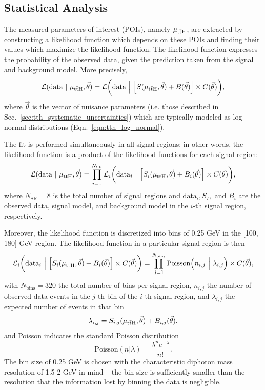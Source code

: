 \subsection{Statistical Analysis} \label{sec:tth_stat_analysis}
The measured parameters of interest (POIs), namely $\mu_{\mathrm{t\bar{t}H}}$, are extracted by constructing a likelihood function which depends on these POIs and finding their values which maximize the likelihood function.
The likelihood function expresses the probability of the observed data, given the prediction taken from the signal and background model.
More precisely,
\begin{equation}
    \mathcal L (\text{data} ~|~ \mu_{\mathrm{t\bar{t}H}}, \vec{\theta}) = \mathcal L \bigg(\text{data} ~\Big|~ \Big[ S(\mu_{\mathrm{t\bar{t}H}}, \vec{\theta}) + B(\vec{\theta}) \Big] \times C(\vec{\theta}) \bigg),
\end{equation} 
where $\vec{\theta}$ is the vector of nuisance parameters (i.e. those described in Sec.~\ref{sec:tth_systematic_uncertainties}) which are typically modeled as log-normal distributions (Eqn.~\ref{eqn:tth_log_normal}).

The fit is performed simultaneously in all signal regions; in other words, the likelihood function is a product of the likelihood functions for each signal region:
\begin{equation}
    \mathcal L (\text{data} ~|~ \mu_{\mathrm{t\bar{t}H}}, \vec{\theta})
    =
    \prod_{i=1}^{N_{\text{SR}}} \mathcal L_i \bigg(\text{data}_i ~\Big|~ \Big[ S_i(\mu_{\mathrm{t\bar{t}H}}, \vec{\theta}) + B_i(\vec{\theta}) \Big] \times C(\vec{\theta}) \bigg),
\end{equation}
where $N_{\text{SR}} = 8$ is the total number of signal regions and $\text{data}_i, S_I,$ and $B_i$ are the observed data, signal model, and background model in the $i$-th signal region, respectively.

Moreover, the likelihood function is discretized into bins of 0.25 GeV in the [100, 180] GeV region. The likelihood function in a particular signal region is then
\begin{equation}
    \mathcal L_i \bigg(\text{data}_i ~\Big|~ \Big[ S_i(\mu_{\mathrm{t\bar{t}H}}, \vec{\theta}) + B_i(\vec{\theta}) \Big] \times C(\vec{\theta}) \bigg)
    = 
    \prod_{j=1}^{N_\text{bins}} \text{Poisson}\Big( n_{i,j} ~\Big|~ \lambda_{i,j} \Big) \times C(\vec{\theta}),
\end{equation}
with $N_\text{bins} = 320$ the total number of bins per signal region, $n_{i,j}$ the number of observed data events in the $j$-th bin of the $i$-th signal region, and $\lambda_{i,j}$ the expected number of events in that bin
\begin{equation}
    \lambda_{i,j} = S_{i,j}(\mu_{\mathrm{t\bar{t}H}}, \vec{\theta}) + B_{i,j}(\vec{\theta}),
\end{equation}
and Poisson indicates the standard Poisson distribution
\begin{equation}
    \text{Poisson}(n|\lambda)
    =
    \frac{\lambda^n e^{-\lambda}}{n!}.
\end{equation}
The bin size of 0.25 GeV is chosen with the characteristic diphoton mass resolution of 1.5-2 GeV in mind -- the bin size is sufficiently smaller than the resolution that the information lost by binning the data is negligible.

